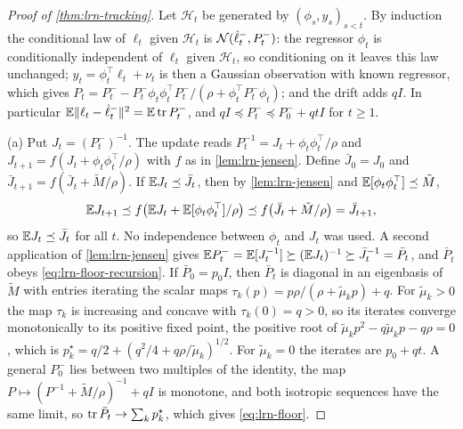 \begin{proof}[Proof of \cref{thm:lrn-tracking}]
Let $\mathcal H_t$ be generated by $(\phi_s,y_s)_{s<t}$. By induction the conditional law of $\ell_t$ given $\mathcal H_t$ is $\mathcal{N}(\hat\ell^-_t,P^-_t)$: the regressor $\phi_t$ is conditionally independent of $\ell_t$ given $\mathcal H_t$, so conditioning on it leaves this law unchanged; $y_t=\phi_t^\top \ell_t+\nu_t$ is then a Gaussian observation with known regressor, which gives $P_t=P^-_t-P^-_t\phi_t\phi_t^\top P^-_t/(\rho+\phi_t^\top P^-_t\phi_t)$; and the drift adds $qI$. In particular $\mathbb{E}\Vert \ell_t-\hat\ell^-_t\Vert^2=\mathbb{E}\operatorname{tr} P^-_t$, and $qI\preceq P^-_t\preceq P^-_0+qtI$ for $t\ge1$.

(a) Put $J_t=(P^-_t)^{-1}$. The update reads $P_t^{-1}=J_t+\phi_t\phi_t^\top/\rho$ and $J_{t+1}=f(J_t+\phi_t\phi_t^\top/\rho)$ with $f$ as in \cref{lem:lrn-jensen}. Define $\bar J_0=J_0$ and $\bar J_{t+1}=f(\bar J_t+\tilde M/\rho)$. If $\mathbb{E} J_t\preceq\bar J_t$, then by \cref{lem:lrn-jensen} and $\mathbb{E}[\phi_t\phi_t^\top]\preceq\tilde M$,
\begin{equation}\label{eq:lrn-jensen-step}
\mathbb{E} J_{t+1}\preceq f\bigl(\mathbb{E} J_t+\mathbb{E}[\phi_t\phi_t^\top]/\rho\bigr)\preceq f\bigl(\bar J_t+\tilde M/\rho\bigr)=\bar J_{t+1},
\end{equation}
so $\mathbb{E} J_t\preceq\bar J_t$ for all $t$. No independence between $\phi_t$ and $J_t$ was used. A second application of \cref{lem:lrn-jensen} gives $\mathbb{E} P^-_t=\mathbb{E}[J_t^{-1}]\succeq(\mathbb{E} J_t)^{-1}\succeq\bar J_t^{-1}=\bar P_t$, and $\bar P_t$ obeys \cref{eq:lrn-floor-recursion}. If $\bar P_0=p_0I$, then $\bar P_t$ is diagonal in an eigenbasis of $\tilde M$ with entries iterating the scalar maps $\tau_k(p)=p\rho/(\rho+\tilde\mu_kp)+q$. For $\tilde\mu_k>0$ the map $\tau_k$ is increasing and concave with $\tau_k(0)=q>0$, so its iterates converge monotonically to its positive fixed point, the positive root of $\tilde\mu_kp^2-q\tilde\mu_kp-q\rho=0$, which is $p^\star_k=q/2+(q^2/4+q\rho/\tilde\mu_k)^{1/2}$. For $\tilde\mu_k=0$ the iterates are $p_0+qt$. A general $P^-_0$ lies between two multiples of the identity, the map $P\mapsto(P^{-1}+\tilde M/\rho)^{-1}+qI$ is monotone, and both isotropic sequences have the same limit, so $\operatorname{tr}\bar P_t\to\sum_kp^\star_k$, which gives \cref{eq:lrn-floor}.


\end{proof}
